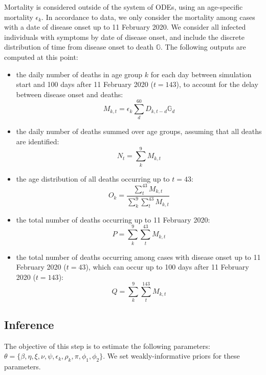 \documentclass{article}
\begin{document}
Mortality is considered outside of the system of ODEs, using an age-specific mortality $\epsilon_k$.
In accordance to data, we only consider the mortality among cases with a date of disease onset up to 11 February 2020.
We consider all infected individuals with symptoms by date of disease onset, and include the discrete distribution of time from disease onset to death $\mathds{G}$. The following outputs are computed at this point:
\begin{itemize}
	\item the daily number of deaths in age group $k$ for each day between simulation start and 100 days after 11 February 2020 ($t=143$), to account for the delay between disease onset and deaths:
	\begin{equation}
	M_{k,t}= \epsilon_k\sum_d^{60}  D_{k,t-d} \mathds{G}_d 
	\end{equation}
	\item the daily number of deaths summed over age groups, assuming that all deaths are identified:
	\begin{equation}
	N_{t}= \sum_k^9 M_{k,t}
	\end{equation}
\item the age distribution of all deaths occurring up to $t=43$:
\begin{equation}
O_k = \frac{\sum_t^{43} M_{k,t}}{\sum_k^9 \sum_t^{43} M_{k,t}}
\end{equation}
\item the total number of deaths occurring up to 11 February 2020:
\begin{equation}
P = \sum_k^9 \sum_t^{43} M_{k,t}
\end{equation}
\item the total number of deaths occurring among cases with disease onset up to 11 February 2020 ($t=43$), which can occur up to 100 days after 11 February 2020 ($t=143$):
\begin{equation}
Q = \sum_k^9 \sum_t^{143} M_{k,t}
\end{equation}
\end{itemize}

\subsection{Inference}

The objective of this step is to estimate the following parameters: $\theta=\{\beta, \eta, \xi, \nu, \psi, \epsilon_k, \rho_k, \pi,  \phi_1, \phi_2 \}$.
We set weakly-informative priors for these parameters.
\end{document}
